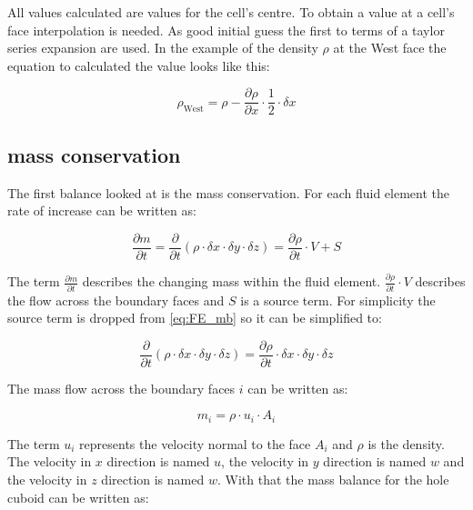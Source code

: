 \documentclass[../thesis.tex]{subfiles}
\begin{document}
All values calculated are values for the cell's centre. To obtain a value at a cell's face interpolation is needed. As good initial guess the first to terms of a taylor series expansion are used. In the example of the density $ \rho$ at the West face the equation to calculated the value looks like this:

\begin{equation}
	\rho_{\mathrm{West}} = \rho -  \dfrac{\partial \rho}{\partial x} \cdot \dfrac{1}{2} \cdot \delta x
\end{equation}

\subsection{mass conservation}

The first balance looked at is the mass conservation. For each fluid element the rate of increase can be written as:

\begin{equation}
	\label{eq:FE_mb}
	\dfrac{\partial m}{\partial t} = \dfrac{\partial}{\partial t}(\rho \cdot \delta x \cdot \delta y \cdot \delta z) = \dfrac{\partial \rho}{\partial t} \cdot V + S
\end{equation}

The term $ \frac{\partial m}{\partial t} $ describes the changing mass within the fluid element. $ \frac{\partial \rho}{\partial t} \cdot V $ describes the flow across the boundary faces and $ S $ is a source term. For simplicity the source term is dropped from \autoref{eq:FE_mb} so it can be simplified to:

\begin{equation}
	\dfrac{\partial}{\partial t}(\rho \cdot \delta x \cdot \delta y \cdot \delta z) = \dfrac{\partial \rho}{\partial t} \cdot \delta x \cdot \delta y \cdot \delta z
\end{equation}

The mass flow across the boundary faces $ i $ can be written as:

\begin{equation}
	m_i = \rho \cdot u_i \cdot A_i
\end{equation}

The term $ u_i $ represents the velocity normal to the face $ A_i$ and $ \rho $ is the density. The velocity in $x$ direction is named $u$, the velocity in $y$ direction is named $w$ and the velocity in $z$ direction is named $w$. With that the mass balance for the hole cuboid can be written as:
\end{document}
